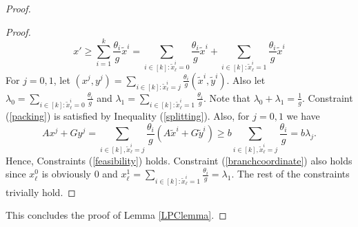 \begin{proof}
\begin{proof}
		\begin{equation}\label{splitting}
		x'\geq \sum_{i=1}^{k}\frac{\theta_i}{g} \tilde{x}^i
		={\sum_{i\in [k]: \tilde{x}^i_\ell =0}\frac{\theta_i}{g} \tilde{x}^i}+{\sum_{i\in [k]: \tilde{x}^i_\ell =1}\frac{\theta_i}{g} \tilde{x}^i}
		\end{equation}
		For $j=0,1$, let $(x^j,y^j) = \sum_{i\in [k]:\tilde{x}^i_\ell=j} \frac{\theta_i}{g}(\tilde{x}^i,\tilde{y}^i)$. Also let $\lambda_0=\sum_{i\in [k]: \tilde{x}^i_\ell =0}\frac{\theta_i}{g}$ and $\lambda_1 = \sum_{i\in [k]: \tilde{x}^i_\ell =1}\frac{\theta_i}{g}$. Note that $\lambda_0+\lambda_1 = \frac{1}{g}$. Constraint (\ref{packing}) is satisfied by Inequality (\ref{splitting}). Also, for $j=0,1$ we have
		\begin{equation}
		Ax^j+Gy^j = \sum_{i\in[k], \tilde{x}^i_\ell = j} \frac{\theta_i}{g} (A\tilde{x}^i + G\tilde{y}^i) \geq b \sum_{i\in[k], \tilde{x}^i_\ell = j} \frac{\theta_i}{g} = b\lambda_j.
		\end{equation}
		Hence, Constraints (\ref{feasibility}) holds. Constraint (\ref{branchcoordinate}) also holds since $x^0_\ell$ is obviously $0$ and $x^1_\ell= \sum_{i\in [k]: \tilde{x}^i_\ell = 1}\frac{\theta_i}{g}= \lambda_1$. The rest of the constraints trivially hold. 
	\end{proof}
	This concludes the proof of Lemma \ref{LPClemma}.	
\end{proof}


